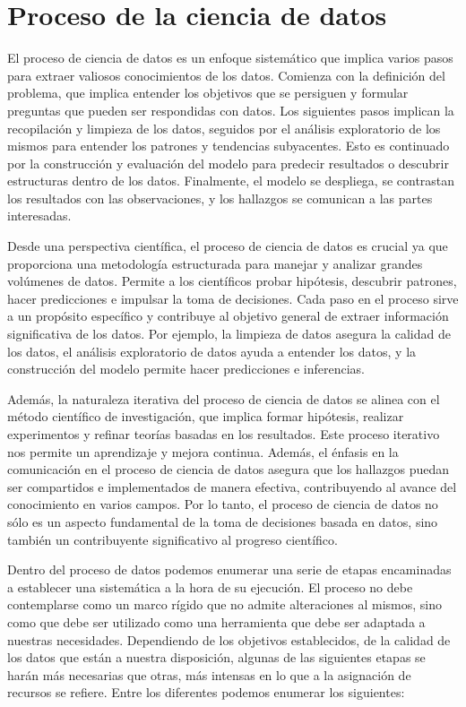 \section{Proceso de la ciencia de datos}
El proceso de ciencia de datos es un enfoque sistemático que implica varios pasos para extraer valiosos conocimientos de los datos. Comienza con la definición del problema, que implica entender los objetivos que se persiguen y formular preguntas que pueden ser respondidas con datos. Los siguientes pasos implican la recopilación y limpieza de los datos, seguidos por el análisis exploratorio de los mismos para entender los patrones y tendencias subyacentes. Esto es continuado por la construcción y evaluación del modelo para predecir resultados o descubrir estructuras dentro de los datos. Finalmente, el modelo se despliega, se contrastan los resultados con las observaciones, y los hallazgos se comunican a las partes interesadas.\par

Desde una perspectiva científica, el proceso de ciencia de datos es crucial ya que proporciona una metodología estructurada para manejar y analizar grandes volúmenes de datos. Permite a los científicos probar hipótesis, descubrir patrones, hacer predicciones e impulsar la toma de decisiones. Cada paso en el proceso sirve a un propósito específico y contribuye al objetivo general de extraer información significativa de los datos. Por ejemplo, la limpieza de datos asegura la calidad de los datos, el análisis exploratorio de datos ayuda a entender los datos, y la construcción del modelo permite hacer predicciones e inferencias.\par

Además, la naturaleza iterativa del proceso de ciencia de datos se alinea con el método científico de investigación, que implica formar hipótesis, realizar experimentos y refinar teorías basadas en los resultados. Este proceso iterativo nos permite un aprendizaje y mejora continua. Además, el énfasis en la comunicación en el proceso de ciencia de datos asegura que los hallazgos puedan ser compartidos e implementados de manera efectiva, contribuyendo al avance del conocimiento en varios campos. Por lo tanto, el proceso de ciencia de datos no sólo es un aspecto fundamental de la toma de decisiones basada en datos, sino también un contribuyente significativo al progreso científico.\par

Dentro del proceso de datos podemos enumerar una serie de etapas encaminadas a establecer una sistemática a la hora de su ejecución. El proceso no debe contemplarse como un marco rígido que no admite alteraciones al mismos, sino como que debe ser utilizado como una herramienta que debe ser adaptada a nuestras necesidades. Dependiendo de los objetivos establecidos, de la calidad de los datos que están a nuestra disposición, algunas de las siguientes etapas se harán más necesarias que otras, más intensas en lo que a la asignación de recursos se refiere. Entre los diferentes podemos enumerar los siguientes:
 
